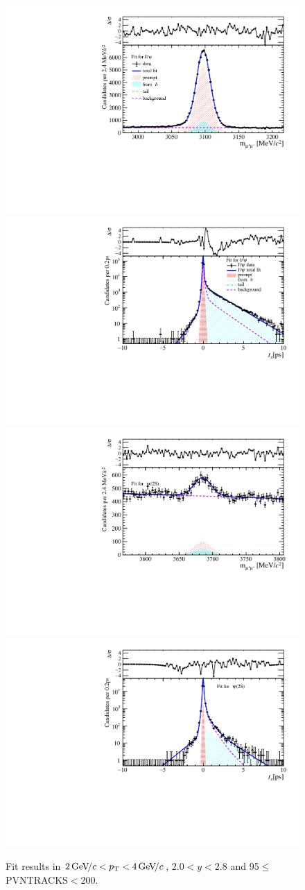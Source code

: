 \begin{figure}[H]
\begin{center}
\includegraphics[width=0.47\linewidth]{pdf/Jpsi/drawmass/n5y1pt2.pdf}
\includegraphics[width=0.47\linewidth]{pdf/Jpsi/2DFit/n5y1pt2.pdf}
\vspace*{-0.5cm}
\includegraphics[width=0.47\linewidth]{pdf/Psi2S/drawmass/n5y1pt2.pdf}
\includegraphics[width=0.47\linewidth]{pdf/Psi2S/2DFit/n5y1pt2.pdf}
\vspace*{-0.5cm}
\end{center}
\caption{Fit results in $2\text{\,Ge\kern -0.1em V\!/}c<p_{\mathrm{T}}<4\text{\,Ge\kern -0.1em V\!/}c$, $2.0<y<2.8$ and 95$\leq$PVNTRACKS$<$200.}
\label{Fitn5y1pt2}
\end{figure}

